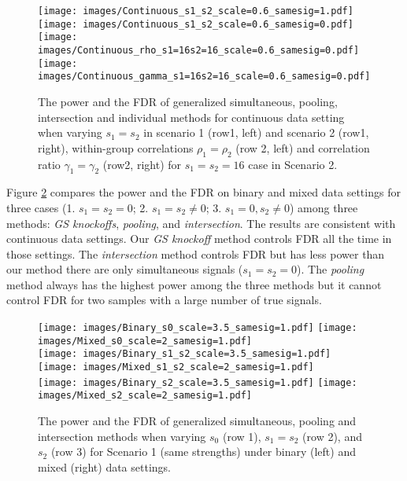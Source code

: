 \documentclass[11pt]{article}
\theoremstyle{plain}
\theoremstyle{definition}
\theoremstyle{remark}
\newcommand{\0}{\mathbf{0}}
\begin{document}
\begin{figure}[h!]
    \centering
    \texttt{[image: images/Continuous\_s1\_s2\_scale=0.6\_samesig=1.pdf]}
    \texttt{[image: images/Continuous\_s1\_s2\_scale=0.6\_samesig=0.pdf]}\\
    \texttt{[image: images/Continuous\_rho\_s1=16s2=16\_scale=0.6\_samesig=0.pdf]}
    \texttt{[image: images/Continuous\_gamma\_s1=16s2=16\_scale=0.6\_samesig=0.pdf]}
    \caption{The power and the FDR of generalized simultaneous, pooling, intersection and individual methods for continuous data setting when varying $s_1=s_2$ in scenario 1 (row1, left) and scenario 2 (row1, right), within-group correlations $\rho_1=\rho_2$ (row 2, left) and correlation ratio $\gamma_1=\gamma_2$ (row2, right) for $s_1=s_2=16$ case in Scenario 2. }
    \label{fig:figure1}
\end{figure}

Figure \ref{fig:figure2} compares the power and the FDR on binary and mixed data settings for three cases (1. $s_1=s_2=0$; 2. $s_1=s_2 \neq 0$; 3. $s_1=0, s_2 \neq 0$) among three methods: \textit{GS knockoffs}, \textit{pooling}, and \textit{intersection}. The results are consistent with continuous data settings. Our \textit{GS knockoff} method controls FDR all the time in those settings. The \textit{intersection} method controls FDR but has less power than our method there are only simultaneous signals ($s_1=s_2=0$). The \textit{pooling} method always has the highest power among the three methods but it cannot control FDR for two samples with a large number of true signals.

\begin{figure}[h!]
    \centering
    \texttt{[image: images/Binary\_s0\_scale=3.5\_samesig=1.pdf]}
    \texttt{[image: images/Mixed\_s0\_scale=2\_samesig=1.pdf]}\\
    \texttt{[image: images/Binary\_s1\_s2\_scale=3.5\_samesig=1.pdf]}
    \texttt{[image: images/Mixed\_s1\_s2\_scale=2\_samesig=1.pdf]}\\
    \texttt{[image: images/Binary\_s2\_scale=3.5\_samesig=1.pdf]}
    \texttt{[image: images/Mixed\_s2\_scale=2\_samesig=1.pdf]}
    \caption{The power and the FDR of generalized simultaneous, pooling and intersection methods when varying $s_0$ (row 1), $s_1=s_2$ (row 2), and $s_2$ (row 3) for Scenario 1 (same strengths) under binary (left) and mixed (right) data settings.}
    \label{fig:figure2}
\end{figure}
\end{document}
